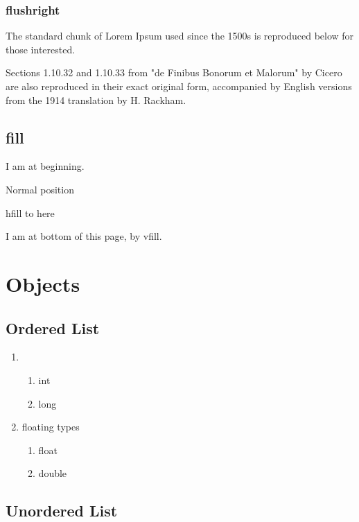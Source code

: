 \documentclass{article}
\begin{document}
\subsubsection{flushright}

\begin{flushright}
The standard chunk of Lorem Ipsum used since the 1500s is reproduced below for those interested. \par
Sections 1.10.32 and 1.10.33 from "de Finibus Bonorum et Malorum" by Cicero are also reproduced in their exact original form, accompanied by English versions from the 1914 translation by H. Rackham.
\end{flushright}

\subsection{fill}

I am at beginning.

Normal position

\hfill hfill to here

\vfill
\begin{center}
    I am at bottom of this page, by vfill.
\end{center}
\newpage

\section{Objects}

\subsection{Ordered List}

\begin{enumerate}
    \item
    \begin{enumerate}
        \item int
        \item long
    \end{enumerate}
    \item floating types
    \begin{enumerate}
        \item float
        \item double
    \end{enumerate}
\end{enumerate}

\subsection{Unordered List}
\end{document}
